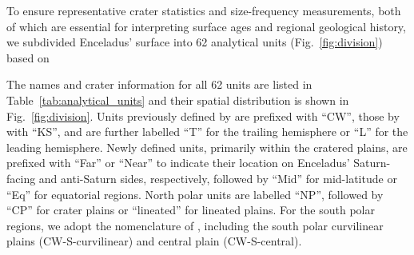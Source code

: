 \documentclass[preprint,11pt,3p,times,authoryear]{elsarticle}
\begin{document}
To ensure representative crater statistics and size-frequency measurements, both of which are essential for interpreting surface ages and regional geological history, we subdivided Enceladus’ surface into 62 analytical units (Fig.~\ref{fig:division}) based on 

The names and crater information for all 62 units are listed in Table~\ref{tab:analytical_units} and their spatial distribution is shown in Fig.~\ref{fig:division}. Units previously defined by \citet{CrowWillard2015} are prefixed with ``CW'', those by \citet{Kirchoff2009} with ``KS'', and are further labelled ``T'' for the trailing hemisphere or ``L'' for the leading hemisphere. Newly defined units, primarily within the cratered plains, are prefixed with ``Far'' or ``Near'' to indicate their location on Enceladus' Saturn-facing and anti-Saturn sides, respectively, followed by ``Mid'' for mid-latitude or ``Eq'' for equatorial regions. North polar units are labelled ``NP'', followed by ``CP'' for crater plains or ``lineated'' for lineated plains. For the south polar regions, we adopt the nomenclature of \citet{CrowWillard2015}, including the south polar curvilinear plains (CW-S-curvilinear) and central plain (CW-S-central).\\
\end{document}
